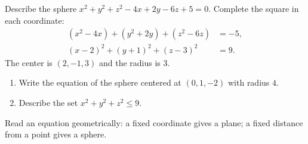\documentclass[11pt]{article}
\begin{document}
\begin{example}{Describe the sphere
  $x^2+y^2+z^2-4x+2y-6z+5=0$.}
Complete the square in each coordinate:
\begin{align*}
 (x^2-4x)+(y^2+2y)+(z^2-6z)&=-5,\\
 (x-2)^2+(y+1)^2+(z-3)^2&=9.
\end{align*}
The center is $\boxed{(2,-1,3)}$ and the radius is $\boxed{3}$.
\end{example}

\begin{checkpoint}
\begin{enumerate}
  \item Write the equation of the sphere centered at $(0,1,-2)$ with radius $4$.
  \item Describe the set $x^2+y^2+z^2\leq 9$.
\end{enumerate}
\end{checkpoint}

\begin{takeaway}
Read an equation geometrically: a fixed coordinate gives a plane; a fixed
distance from a point gives a sphere.
\end{takeaway}
\end{document}
